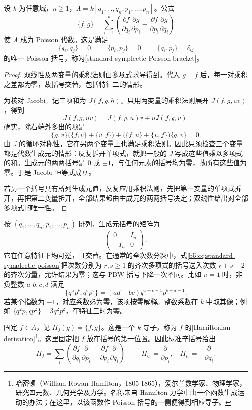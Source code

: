 \begin{proposition}\label{b5:prop:standard-symplectic-poisson}
	设 \(k\) 为任意域，\(n\ge1\)，\(A=k[q_1,\ldots,q_n,p_1,\ldots,p_n]\)。公式
	\begin{equation}\label{b5:eq:standard-symplectic-poisson}
		\{f,g\}=\sum_{i=1}^n
		\left(\frac{\partial f}{\partial q_i}\frac{\partial g}{\partial p_i}
		-\frac{\partial f}{\partial p_i}\frac{\partial g}{\partial q_i}\right)
	\end{equation}
	使 \(A\) 成为 Poisson 代数。这是满足
	\[
		\{q_i,q_j\}=0,\qquad \{p_i,p_j\}=0,\qquad
		\{q_i,p_j\}=\delta_{ij}
	\]
	的唯一 Poisson 括号，称为[standard symplectic Poisson bracket]。
\end{proposition}
\begin{proof}
	双线性及两变量的乘积法则由多项式求导得到。代入 \(g=f\) 后，每一对乘积之差都为零，故括号交替，包括特征二的情形。

	为核对 Jacobi，记三项和为 \(J(f,g,h)\)。只用两变量的乘积法则展开 \(J(f,g,uv)\)，得到
	\[
		J(f,g,uv)=J(f,g,u)v+uJ(f,g,v).
	\]
	确实，除右端外多出的项是
	\[
		\{g,u\}\bigl(\{f,v\}+\{v,f\}\bigr)
		+\bigl(\{f,u\}+\{u,f\}\bigr)\{g,v\}=0.
	\]
	由 \(J\) 的循环对称性，它在另两个变量上也满足乘积法则。因此只须检查三个变量都是代数生成元的情形：反复拆开单项式，就把一般的 \(J\) 写成这些值乘以多项式的和。生成元的两两括号是 \(0\) 或 \(\pm1\)，与任何元素的括号均为零，故所有这些值为零。于是 Jacobi 恒等式成立。

	若另一个括号具有所列生成元值，反复应用乘积法则，先把第一变量的单项式拆开，再把第二变量拆开，全部结果都由生成元的两两括号决定；双线性给出对全部多项式的唯一性。
\end{proof}

按 \((q_1,\ldots,q_n,p_1,\ldots,p_n)\) 排列，生成元括号的矩阵为
\[
	\begin{pmatrix}0&I_n\\-I_n&0\end{pmatrix}.
\]
它在任意特征下均可逆，且交替。在通常的全次数分次中，式\eqref{b5:eq:standard-symplectic-poisson}把次数分别为 \(r,s\ge1\) 的齐次多项式的括号送入次数 \(r+s-2\) 的齐次分量，允许结果为零；这与 PBW 括号下降一次不同。比如 \(n=1\) 时，非负整数 \(a,b,c,d\) 满足
\[
	\{q^ap^b,q^cp^d\}=(ad-bc)q^{a+c-1}p^{b+d-1}.
\]
若某个指数为 \(-1\)，对应系数必为零，该项按零解释。整数系数在 \(k\) 中取其像；例如 \(\{q^2p,qp^2\}=3q^2p^2\)，在特征三时为零。

\ProseParagraphBreak
固定 \(f\in A\)，记 \(H_f(g)=\{f,g\}\)。这是一个 \(k\) 导子，称为 \(f\) 的[Hamiltonian derivation]\footnote{哈密顿（William Rowan Hamilton，1805-1865），爱尔兰数学家、物理学家，研究四元数、几何光学及力学。名称来自 Hamilton 力学中由一个函数生成运动的办法；在这里，以该函数作 Poisson 括号的一侧便得到相应导子。}。这里固定把 \(f\) 放在括号的第一位置。因此标准辛括号给出
\[
	H_f=\sum_i\left(
	\frac{\partial f}{\partial q_i}\frac{\partial}{\partial p_i}
	-\frac{\partial f}{\partial p_i}\frac{\partial}{\partial q_i}\right),
	\qquad H_{q_i}=\frac{\partial}{\partial p_i},\quad
	H_{p_i}=-\frac{\partial}{\partial q_i}.
\]

